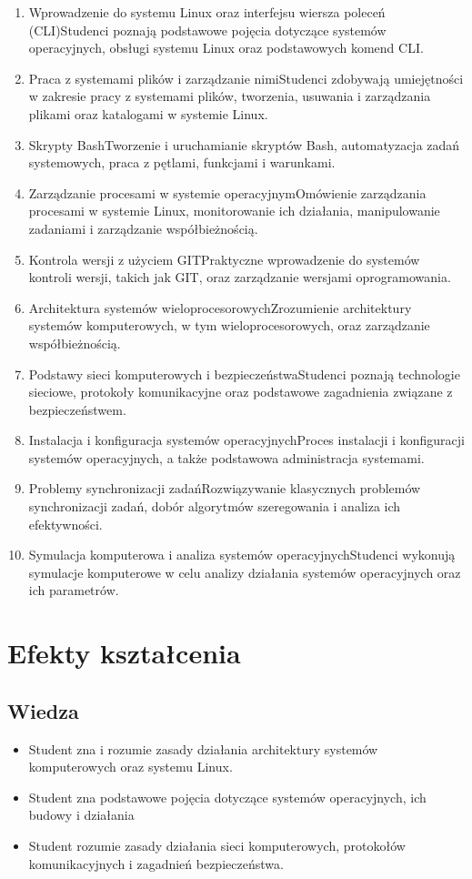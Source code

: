 \documentclass[12pt, a4paper]{article}
\begin{document}
\begin{enumerate}
  \item Wprowadzenie do systemu Linux oraz interfejsu wiersza poleceń (CLI)Studenci poznają podstawowe pojęcia dotyczące systemów operacyjnych, obsługi systemu Linux oraz podstawowych komend CLI.
  \item Praca z systemami plików i zarządzanie nimiStudenci zdobywają umiejętności w zakresie pracy z systemami plików, tworzenia, usuwania i zarządzania plikami oraz katalogami w systemie Linux.
  \item Skrypty BashTworzenie i uruchamianie skryptów Bash, automatyzacja zadań systemowych, praca z pętlami, funkcjami i warunkami.
  \item Zarządzanie procesami w systemie operacyjnymOmówienie zarządzania procesami w systemie Linux, monitorowanie ich działania, manipulowanie zadaniami i zarządzanie współbieżnością.
  \item Kontrola wersji z użyciem GITPraktyczne wprowadzenie do systemów kontroli wersji, takich jak GIT, oraz zarządzanie wersjami oprogramowania.
  \item Architektura systemów wieloprocesorowychZrozumienie architektury systemów komputerowych, w tym wieloprocesorowych, oraz zarządzanie współbieżnością.
  \item Podstawy sieci komputerowych i bezpieczeństwaStudenci poznają technologie sieciowe, protokoły komunikacyjne oraz podstawowe zagadnienia związane z bezpieczeństwem.
  \item Instalacja i konfiguracja systemów operacyjnychProces instalacji i konfiguracji systemów operacyjnych, a także podstawowa administracja systemami.
  \item Problemy synchronizacji zadańRozwiązywanie klasycznych problemów synchronizacji zadań, dobór algorytmów szeregowania i analiza ich efektywności.
  \item Symulacja komputerowa i analiza systemów operacyjnychStudenci wykonują symulacje komputerowe w celu analizy działania systemów operacyjnych oraz ich parametrów.
\end{enumerate}

\section{Efekty kształcenia}

\subsection*{Wiedza}
\begin{itemize}
  \item Student zna i rozumie zasady działania architektury systemów komputerowych oraz systemu Linux.
  \item Student zna podstawowe pojęcia dotyczące systemów operacyjnych, ich budowy i działania
  \item Student rozumie zasady działania sieci komputerowych, protokołów komunikacyjnych i zagadnień bezpieczeństwa.
\end{itemize}
\end{document}
